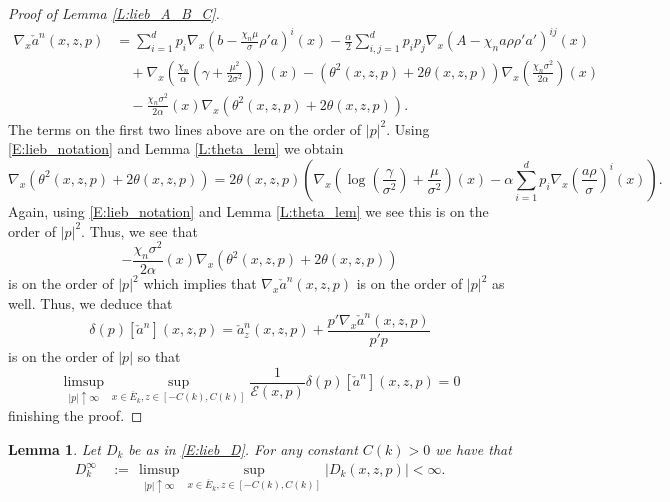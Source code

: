 \documentclass[11pt, letterpaper]{amsart}
\newtheorem{lemma}[theorem]{Lemma}
\theoremstyle{definition}
\theoremstyle{remark}
\numberwithin{equation}{section}
\newcommand{\EN}{\mathcal{E}}
\newcommand{\dfn}{\, := \,}
\newcommand{\ol}[1]{\overline{#1}}
\begin{document}
\begin{proof}[Proof of Lemma \ref{L:lieb_A_B_C}]
\begin{equation*}
\begin{split}
\nabla_x\check{a}^n(x,z,p) &= \sum_{i=1}^d p_i \nabla_x\left(b-\frac{\chi_n\mu}{\sigma}\rho'a\right)^i(x) - \frac{\alpha}{2}\sum_{i,j=1}^d p_i p_j \nabla_x\left(A-\chi_n a\rho\rho'a'\right)^{ij}(x)\\
&\quad + \nabla_x\left(\frac{\chi_n}{\alpha}\left(\gamma + \frac{\mu^2}{2\sigma^2}\right)\right)(x) - \left(\theta^2(x,z,p)+2\theta(x,z,p)\right)\nabla_x\left(\frac{\chi_n\sigma^2}{2\alpha}\right)(x)\\
&\quad - \frac{\chi_n\sigma^2}{2\alpha}(x)\nabla_x\left(\theta^2(x,z,p)+2\theta(x,z,p)\right).
\end{split}
\end{equation*}
The terms on the first two lines above are on the order of $|p|^2$.  Using \eqref{E:lieb_notation} and Lemma \ref{L:theta_lem} we obtain
\begin{equation*}
\nabla_x\left(\theta^2(x,z,p)+2\theta(x,z,p)\right) = 2\theta(x,z,p)\left(\nabla_x\left(\log\left(\frac{\gamma}{\sigma^2}\right)+\frac{\mu}{\sigma^2}\right)(x) - \alpha\sum_{i=1}^d p_i \nabla_x\left(\frac{a\rho}{\sigma}\right)^{i}(x)\right).
\end{equation*}
Again, using \eqref{E:lieb_notation} and Lemma \ref{L:theta_lem} we see this is on the order of $|p|^2$.  Thus, we see that
\begin{equation*}
- \frac{\chi_n\sigma^2}{2\alpha}(x)\nabla_x\left(\theta^2(x,z,p)+2\theta(x,z,p)\right)
\end{equation*}
is on the order of $|p|^2$ which implies that $\nabla_x\check{a}^n(x,z,p)$ is on the order of $|p|^2$ as well.  Thus, we deduce that
\begin{equation*}
\delta(p)[\check{a}^n](x,z,p) = \check{a}^n_z(x,z,p) + \frac{p'\nabla_x\check{a}^n(x,z,p)}{p'p}
\end{equation*}
is on the order of $|p|$ so that
\begin{equation*}
\limsup_{|p|\uparrow\infty}\sup_{x\in\ol{E}_k,z\in[-C(k),C(k)]} \frac{1}{\EN(x,p)}\delta(p)[\check{a}^n](x,z,p) = 0
\end{equation*}
finishing the proof.
\end{proof}


\begin{lemma}\label{L:lieb_D}
Let $D_k$ be as in \eqref{E:lieb_D}.  For any constant $C(k)>0$ we have that
\begin{equation}\label{E:lieb_D_inf}
\begin{split}
D^\infty_k &\dfn \limsup_{|p|\uparrow\infty}\sup_{x\in\ol{E}_k, z\in[-C(k),C(k)]} |D_k(x,z,p)| < \infty.\\
\end{split}
\end{equation}
\end{lemma}
\end{document}
